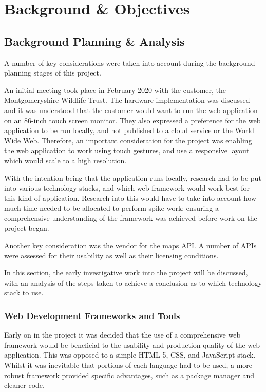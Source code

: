 \chapter{Background \& Objectives}

\section{Background Planning \& Analysis}

A number of key considerations were taken into account during the background planning stages of this project.

An initial meeting took place in February 2020 with the customer, the Montgomeryshire Wildlife Trust. The hardware implementation was discussed and it was understood that the customer would want to run the web application on an 86-inch touch screen monitor. They also expressed a preference for the web application to be run locally, and not published to a cloud service or the World Wide Web. Therefore, an important consideration for the project was enabling the web application to work using touch gestures, and use a responsive layout which would scale to a high resolution.

With the intention being that the application runs locally, research had to be put into various technology stacks, and which web framework would work best for this kind of application. Research into this would have to take into account how much time needed to be allocated to perform spike work; ensuring a comprehensive understanding of the framework was achieved before work on the project began.

Another key consideration was the vendor for the maps API. A number of APIs were assessed for their usability as well as their licensing conditions.

In this section, the early investigative work into the project will be discussed, with an analysis of the steps taken to achieve a conclusion as to which technology stack to use. 

\subsection{Web Development Frameworks and Tools}

Early on in the project it was decided that the use of a comprehensive web framework would be beneficial to the usability and production quality of the web application. This was opposed to a simple HTML 5, CSS, and JavaScript stack. Whilst it was inevitable that portions of each language had to be used, a more robust framework provided specific advantages, such as a package manager and cleaner code.

